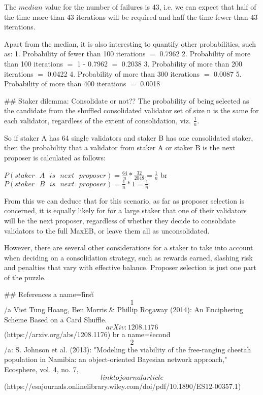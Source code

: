 The $median$ value for the number of failures is 43, i.e. we can expect
that half of the time more than 43 iterations will be required and half
the time fewer than 43 iterations.

Apart from the median, it is also interesting to quantify other
probabilities, such as: 1. Probability of fewer than 100 iterations $=$
0.7962 2. Probability of more than 100 iterations $=$ 1 - 0.7962 $=$
0.2038 3. Probability of more than 200 iterations $=$ 0.0422 4.
Probability of more than 300 iterations $=$ 0.0087 5. Probability of
more than 400 iterations $=$ 0.0018

\## Staker dilemma: Consolidate or not?? The probability of being
selected as the candidate from the shuffled consolidated validator set
of size \*n\* is the same for each validator, regardless of the extent
of consolidation, viz. $\frac{1}{n}$.

So if staker \*A\* has 64 single validators and staker \*B\* has one
consolidated staker, then the probability that a validator from staker
\*A\* or staker \*B\* is the next proposer is calculated as follows:

$P(staker \texttt{ } A \texttt{ } is \texttt{ } next \texttt{ } proposer) =
 \frac{64}{n} * \frac{32}{2048} = \frac{1}{n}$ \<br\>
$P(staker \texttt{ } B \texttt{ } is \texttt{ } next \texttt{ } proposer) =
 \frac{1}{n} * 1 = \frac{1}{n}$

From this we can deduce that for this scenario, as far as proposer
selection is concerned, it is equally likely for for a large staker that
one of their validators will be the next proposer, regardless of whether
they decide to consolidate validators to the full MaxEB, or leave them
all as unconsolidated.

However, there are several other considerations for a staker to take
into account when deciding on a consolidation strategy, such as rewards
earned, slashing risk and penalties that vary with effective balance.
Proposer selection is just one part of the puzzle.

\## References \<a name=\"first\"\>\[1\]\</a\> Viet Tung Hoang, Ben
Morris & Phillip Rogaway (2014): An Enciphering Scheme Based on a Card
Shuffle. \[arXiv:1208.1176\](https://arxiv.org/abs/1208.1176) \<br\> \<a
name=\"second\"\>\[2\]\</a\>: S. Johnson et al. (2013): "Modeling the
viability of the free-ranging cheetah population in Namibia: an
object-oriented Bayesian network approach," Ecosphere, vol. 4, no. 7,
\[link to journal
article\](https://esajournals.onlinelibrary.wiley.com/doi/pdf/10.1890/ES12-00357.1)
